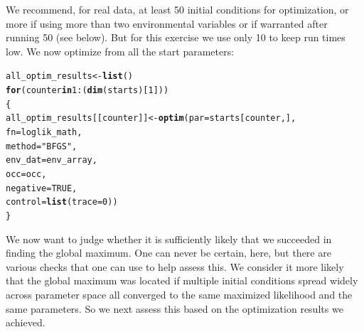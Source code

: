 \documentclass[11pt]{article}\usepackage[]{graphicx}\usepackage[]{xcolor}
\makeatletter
\newcommand{\hlnum}[1]{\textcolor[rgb]{0.686,0.059,0.569}{#1}}%
\newcommand{\hlsng}[1]{\textcolor[rgb]{0.192,0.494,0.8}{#1}}%
\newcommand{\hlopt}[1]{\textcolor[rgb]{0,0,0}{#1}}%
\newcommand{\hldef}[1]{\textcolor[rgb]{0.345,0.345,0.345}{#1}}%
\newcommand{\hlkwa}[1]{\textcolor[rgb]{0.161,0.373,0.58}{\textbf{#1}}}%
\newcommand{\hlkwb}[1]{\textcolor[rgb]{0.69,0.353,0.396}{#1}}%
\newcommand{\hlkwc}[1]{\textcolor[rgb]{0.333,0.667,0.333}{#1}}%
\newcommand{\hlkwd}[1]{\textcolor[rgb]{0.737,0.353,0.396}{\textbf{#1}}}%
\newenvironment{kframe}{%
 \def\at@end@of@kframe{}%
 \ifinner\ifhmode%
  \def\at@end@of@kframe{\end{minipage}}%
  \begin{minipage}{\columnwidth}%
 \fi\fi%
 \def\FrameCommand##1{\hskip\@totalleftmargin \hskip-\fboxsep
 \colorbox{shadecolor}{##1}\hskip-\fboxsep
     \hskip-\linewidth \hskip-\@totalleftmargin \hskip\columnwidth}%
 \MakeFramed {\advance\hsize-\width
   \@totalleftmargin\z@ \linewidth\hsize
   \@setminipage}}%
 {\par\unskip\endMakeFramed%
 \at@end@of@kframe}
\newenvironment{knitrout}{}{} %
\makeatother
\begin{document}
\noindent We recommend, for real data, at least 50 initial conditions for optimization, or more if using more than two
environmental variables or if warranted after running 50 (see below). But for this exercise we use only 10 
to keep run times low. 
We now optimize from all the start parameters:
\begin{knitrout}
\color{fgcolor}\begin{kframe}
\begin{alltt}
\hldef{all_optim_results} \hlkwb{<-} \hlkwd{list}\hldef{()}
\hlkwa{for} \hldef{(counter} \hlkwa{in} \hlnum{1}\hlopt{:}\hldef{(}\hlkwd{dim}\hldef{(starts)[}\hlnum{1}\hldef{]))}
\hldef{\{}
  \hldef{all_optim_results [[counter]]} \hlkwb{<-} \hlkwd{optim}\hldef{(}\hlkwc{par} \hldef{= starts[counter, ],}
                                        \hlkwc{fn} \hldef{= loglik_math,}
                                        \hlkwc{method} \hldef{=} \hlsng{"BFGS"}\hldef{,}
                                        \hlkwc{env_dat} \hldef{= env_array,}
                                        \hlkwc{occ} \hldef{= occ,}
                                        \hlkwc{negative} \hldef{=} \hlnum{TRUE}\hldef{,}
                                        \hlkwc{control}\hldef{=}\hlkwd{list}\hldef{(}\hlkwc{trace} \hldef{=} \hlnum{0}\hldef{))}
\hldef{\}}
\end{alltt}
\end{kframe}
\end{knitrout}
\noindent We now want to judge whether it is sufficiently likely that we succeeded in finding the 
global maximum. One can never be certain, here, but there are various checks that one can use
to help assess this. We consider it more likely that the global maximum was located if
multiple initial conditions spread widely across parameter space all converged to the 
same maximized likelihood and the same parameters. So we next assess this based on
the optimization results we achieved. 
\end{document}
